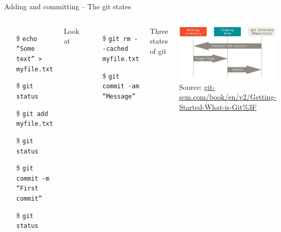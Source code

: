 \documentclass[aspectratio=169]{beamer}
\newcommand{\code}[1]{\texttt{\color{mygreen}#1}}
\begin{document}
\begin{frame}
  {Adding and committing -- The git states}

  \begin{columns}
  \begin{itemize}
    \item[\$] \code{echo “Some text” > myfile.txt}
    \item[\$] \code{git status}
    \item[\$] \code{git add myfile.txt}
    \item[\$] \code{git status}
    \item[\$] \code{git commit -m “First commit”}
    \item[\$] \code{git status}
  \end{itemize}

  \vfill

  Look at
  \begin{itemize}
    \item[\$] \code{git rm -{}-cached myfile.txt}
    \item[\$] \code{git commit -am “Message”}
  \end{itemize}


  \alert{Three states of git}

    \includegraphics[width=\textwidth]{areas}
  {\tiny Source:
    \href{https://git-scm.com/book/en/v2/Getting-Started-What-is-Git\%3F}%
    {git-scm.com/book/en/v2/Getting-Started-What-is-Git\%3F}}
  \end{columns}

\end{frame}
\end{document}
